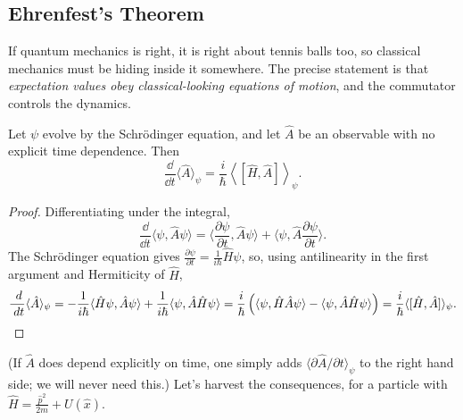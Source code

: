 \documentclass[a4paper]{scrartcl}
\newcommand{\inp}[2]{\langle #1, #2 \rangle}
\begin{document}
\subsection{Ehrenfest's Theorem}

If quantum mechanics is right, it is right about tennis balls too, so classical mechanics must be hiding inside it somewhere. The precise statement is that \emph{expectation values obey classical-looking equations of motion}, and the commutator controls the dynamics.

\begin{theorem}
    Let $\psi$ evolve by the Schr\"odinger equation, and let $\hat{A}$ be an observable with no explicit time dependence. Then
    $$
    \frac{\dd}{\dd t} \langle \hat{A} \rangle_\psi = \frac{i}{\hbar} \left\langle [\hat{H}, \hat{A}] \right\rangle_\psi.
    $$
\end{theorem}
\begin{proof}
    Differentiating under the integral,
    $$
    \frac{\dd}{\dd t} \inp{\psi}{\hat{A} \psi} = \Big\langle \frac{\partial \psi}{\partial t}, \hat{A} \psi \Big\rangle + \Big\langle \psi, \hat{A} \frac{\partial \psi}{\partial t} \Big\rangle.
    $$
    The Schr\"odinger equation gives $\frac{\partial \psi}{\partial t} = \frac{1}{i\hbar}\hat{H}\psi$, so, using antilinearity in the first argument and Hermiticity of $\hat{H}$,
    $$
    \frac{\dd}{\dd t} \langle \hat{A} \rangle_\psi = -\frac{1}{i\hbar}\inp{\hat H \psi}{\hat{A}\psi} + \frac{1}{i \hbar} \inp{\psi}{\hat{A}\hat{H}\psi}
    = \frac{i}{\hbar} \left( \inp{\psi}{\hat H \hat A \psi} - \inp{\psi}{\hat{A}\hat{H}\psi} \right) = \frac{i}{\hbar}\langle [\hat H, \hat A] \rangle_\psi. \qedhere
    $$
\end{proof}

(If $\hat{A}$ does depend explicitly on time, one simply adds $\langle \partial \hat{A}/\partial t \rangle_\psi$ to the right hand side; we will never need this.) Let's harvest the consequences, for a particle with $\hat{H} = \frac{\hat{p}^2}{2m} + U(\hat{x})$.
\end{document}
